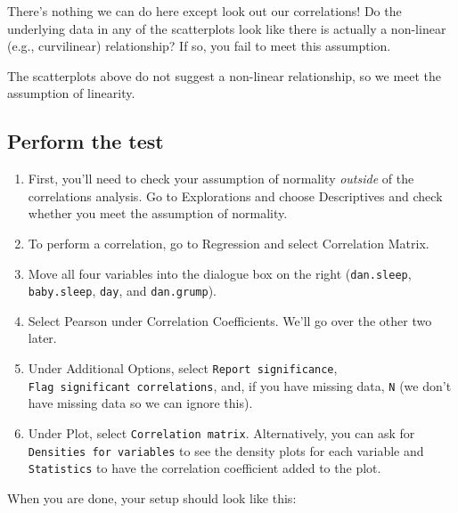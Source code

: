 \documentclass[
]{book}
\begin{document}
There's nothing we can do here except look out our correlations! Do the underlying data in any of the scatterplots look like there is actually a non-linear (e.g., curvilinear) relationship? If so, you fail to meet this assumption.

The scatterplots above do not suggest a non-linear relationship, so we meet the assumption of linearity.

\hypertarget{perform-the-test-9}{%
\subsection{Perform the test}\label{perform-the-test-9}}

\begin{enumerate}
\def\labelenumi{\arabic{enumi}.}
\item
  First, you'll need to check your assumption of normality \emph{outside} of the correlations analysis. Go to Explorations and choose Descriptives and check whether you meet the assumption of normality.
\item
  To perform a correlation, go to Regression and select Correlation Matrix.
\item
  Move all four variables into the dialogue box on the right (\texttt{dan.sleep}, \texttt{baby.sleep}, \texttt{day}, and \texttt{dan.grump}).
\item
  Select Pearson under Correlation Coefficients. We'll go over the other two later.
\item
  Under Additional Options, select \texttt{Report\ significance}, \texttt{Flag\ significant\ correlations}, and, if you have missing data, \texttt{N} (we don't have missing data so we can ignore this).
\item
  Under Plot, select \texttt{Correlation\ matrix}. Alternatively, you can ask for \texttt{Densities\ for\ variables} to see the density plots for each variable and \texttt{Statistics} to have the correlation coefficient added to the plot.
\end{enumerate}

When you are done, your setup should look like this:
\end{document}

